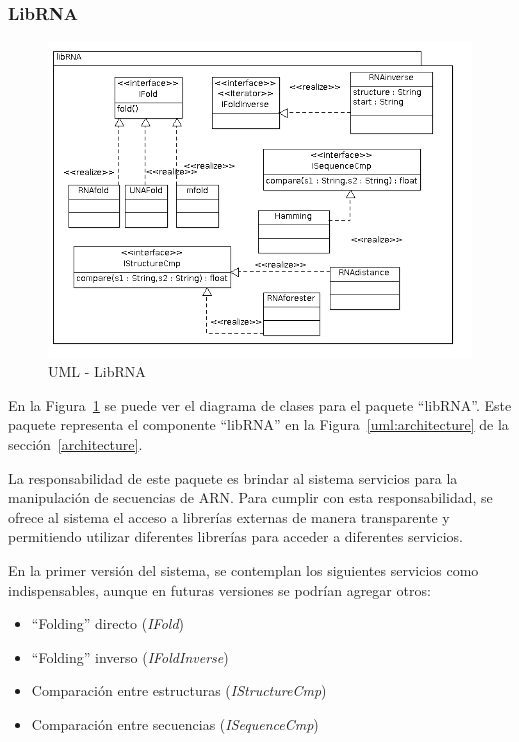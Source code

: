  \subsubsection{LibRNA}
   \begin{figure}
      \centering
      \includegraphics[scale=0.5]{lld-librna.png}  
      \caption{UML - LibRNA}
      \label{uml:lld-librna}
    \end{figure}

  En la Figura~\ref{uml:lld-librna} se puede ver el diagrama de clases
para el paquete ``libRNA''. Este paquete representa el componente
``libRNA'' en la Figura~\ref{uml:architecture} de la
secci\'on~\ref{architecture}.

  La responsabilidad de este paquete es brindar al sistema servicios para la
manipulaci\'on de secuencias de ARN. Para cumplir con esta responsabilidad, se
ofrece al sistema el acceso a librer\'ias externas de manera transparente y
permitiendo utilizar diferentes librer\'ias para acceder a diferentes servicios.

  En la primer versi\'on del sistema, se contemplan los siguientes servicios
como indispensables, aunque en futuras versiones se podr\'ian agregar otros:

  \begin{itemize}
   \item ``Folding'' directo (\textit{IFold})
   \item ``Folding'' inverso (\textit{IFoldInverse})
   \item Comparaci\'on entre estructuras (\textit{IStructureCmp})
   \item Comparaci\'on entre secuencias (\textit{ISequenceCmp})
  \end{itemize}

